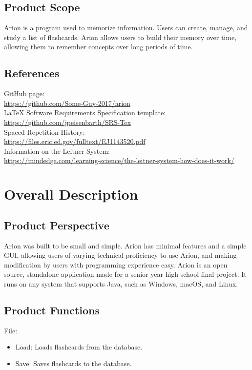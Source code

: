 \documentclass{scrreprt}
\begin{document}
\section{Product Scope}
Arion is a program used to memorize information. Users can create, manage, and study a list of flashcards.
Arion allows users to build their memory over time, allowing them to remember concepts over long periods of time.

\section{References}
\begin{flushleft} 
    GitHub page: \\
    \url{https://github.com/Some-Guy-2017/arion} \\
    LaTeX Software Requirements Specification template: \\
    \url{https://github.com/jpeisenbarth/SRS-Tex} \\
    Spaced Repetition History: \\
    \url{https://files.eric.ed.gov/fulltext/EJ1143520.pdf} \\
    Information on the Leitner System: \\
    \url{https://mindedge.com/learning-science/the-leitner-system-how-does-it-work/} \\
\end{flushleft}


\chapter{Overall Description}

\section{Product Perspective}
Arion was built to be small and simple.
Arion has minimal features and a simple GUI, allowing users of varying technical proficiency to use Arion,
and making modification by users with programming experience easy.
Arion is an open source, standalone application made for a senior year high school final project.
It runs on any system that supports Java, such as Windows, macOS, and Linux.

\section{Product Functions}
\label{sec:Product Functions}
File:
\begin{itemize}
    \item Load: Loads flashcards from the database.
    \item Save: Saves flashcards to the database.
\end{itemize}
\end{document}
